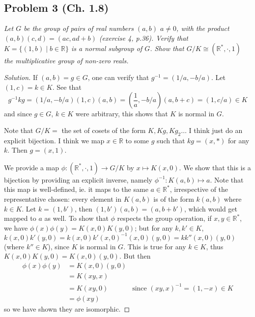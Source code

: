 \documentclass{article}
\newcommand{\R}{{\mathbb R}}
\begin{document}
\subsection*{Problem 3 (Ch. 1.8)}
{\it Let $G$ be the group of pairs of real numbers $(a,b)$ $a\neq0$,
with the product $(a,b)(c,d) = (ac,ad+b)$ (exercise 4, p.36).
Verify that $K = \{(1,b)\mid b\in\R\}$ is a normal subgroup of $G$.
Show that $G/K \cong (\R^*,\cdot,1)$ the multiplicative group of non-zero reals.}
\begin{proof}[Solution]\let\qed\relax
	If $(a,b) = g \in G$, one can verify that $g^{-1} = (1/a, -b/a)$.
	Let $(1,c) = k \in K$.
	See that
	\[
		g^{-1}kg = (1/a, -b/a)(1,c)(a,b) = (\frac{1}{a}, -b/a)(a,b+c)
		= (1,c/a) \in K
	\]
	and since $g \in G$, $k \in K$ were arbitrary,
	this shows that $K$ is normal in $G$.

	Note that $G/K = $ the set of cosets of the form $K, Kg, Kg_2\dots$
	I think just do an explicit bijection.
	I think we map $x \in \R$ to some $g$ such that $kg = (x,*)$ for any $k$.
	Then $g = (x,1)$.

	We provide a map $\phi \colon (\R^*,\cdot,1) \to G/K$
	by $x \mapsto K(x,0)$.
	We show that this is a bijection by providing an explicit inverse,
	namely $\phi^{-1} \colon K(a,b) \mapsto a$.
	Note that this map is well-defined, ie. it maps to the same $a \in \R^*$,
	irrespective of the representative chosen:
	every element in $K(a,b)$ is of the form $k(a,b)$ where $k\in K$.
	Let $k = (1,b')$, then $(1,b')(a,b) = (a,b+b')$,
	which would get mapped to $a$ as well.
	To show that $\phi$ respects the group operation,
	if $x,y \in \R^*$,
	we have $\phi(x)\phi(y) = K(x,0)K(y,0)$;
	but for any $k,k' \in K$, $k(x,0)k'(y,0) = k(x,0)k'(x,0)^{-1}(x,0)(y,0) = kk''(x,0)(y,0)$ (where $k''\in K$), since $K$ is normal in $G$.
	This is true for any $k \in K$, thus $K(x,0)K(y,0) = K(x,0)(y,0)$.
	But then
	\begin{align*}
		\phi(x)\phi(y)
		&= K(x,0)(y,0)\\
		&= K(xy,x)\\
		&= K(xy,0) &\text{since }(xy,x)^{-1} = (1,-x) \in K\\
		&= \phi(xy)
	\end{align*}
	so we have shown they are isomorphic.
\end{proof}
\end{document}

